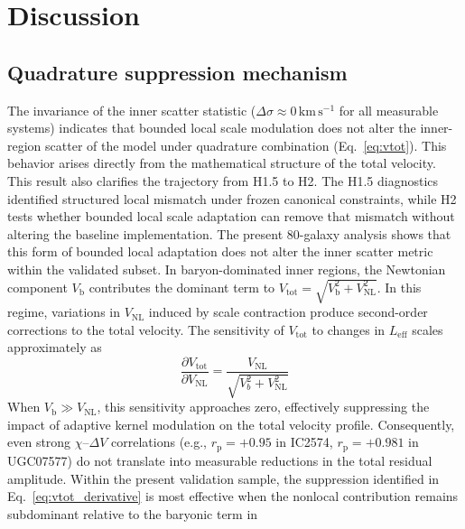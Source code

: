 \documentclass{aa}
\begin{document}
	\section{Discussion}
	
	\subsection{Quadrature suppression mechanism}
	
	The invariance of the inner scatter statistic ($\Delta\sigma \approx 0\,\mathrm{km\,s^{-1}}$
	for all measurable systems) indicates that bounded local scale modulation
	does not alter the inner-region scatter of the model under quadrature
	combination (Eq.~\ref{eq:vtot}). This behavior arises directly from the
	mathematical structure of the total velocity.
	This result also clarifies the trajectory from H1.5 to H2. The H1.5 diagnostics identified structured
	local mismatch under frozen canonical constraints, while H2 tests whether bounded local scale adaptation
	can remove that mismatch without altering the baseline implementation. The present 80-galaxy analysis
	shows that this form of bounded local adaptation does not alter the inner scatter metric within the
	validated subset.
	In baryon-dominated inner regions, the Newtonian component $V_{\mathrm{b}}$ 
	contributes the dominant term to 
	$V_{\mathrm{tot}} = \sqrt{V_{\mathrm{b}}^2 + V_{\mathrm{NL}}^2}$. 
	In this regime, variations in $V_{\mathrm{NL}}$ induced by scale contraction 
	produce second-order corrections to the total velocity. The sensitivity of 
	$V_{\mathrm{tot}}$ to changes in $L_{\mathrm{eff}}$ scales approximately as
\begin{equation}
	\frac{\partial V_{\mathrm{tot}}}{\partial V_{\mathrm{NL}}}
	=
	\frac{V_{\mathrm{NL}}}
	{\sqrt{V_b^2 + V_{\mathrm{NL}}^2}}
	\label{eq:vtot_derivative}
\end{equation}
	When $V_{\mathrm{b}} \gg V_{\mathrm{NL}}$, this sensitivity approaches zero,
	effectively suppressing the impact of adaptive kernel modulation on the total
	velocity profile. Consequently, even strong $\chi$--$\Delta V$ correlations
	(e.g., $r_{\mathrm{p}} = +0.95$ in IC2574, $r_{\mathrm{p}} = +0.981$ in
	UGC07577) do not translate into measurable reductions in the total residual
	amplitude.
	Within the present validation sample, the suppression identified in 
	Eq.~\ref{eq:vtot_derivative} is most effective when the nonlocal 
	contribution remains subdominant relative to the baryonic term in 
\end{document}
